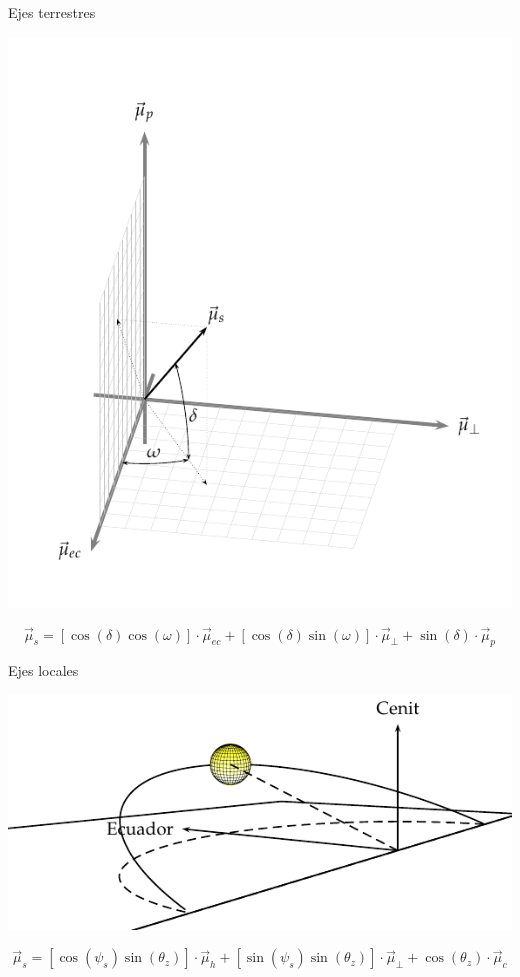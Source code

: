 \documentclass[xcolor={usenames,svgnames,dvipsnames}]{beamer}
\begin{document}
\begin{frame}[label={sec:org174ea23}]{Ejes terrestres}
\begin{center}
\includegraphics[height=0.7\textheight]{../figs/SistemaCoordenadasTerrestre.pdf}
\end{center}


\[\vec{\mu}_{s}=\left[\cos\left(\delta\right)\cos\left(\omega\right)\right]\cdot\vec{\mu}_{ec}+\left[\cos\left(\delta\right)\sin\left(\omega\right)\right]\cdot\vec{\mu}_{\bot}+\sin\left(\delta\right)\cdot\vec{\mu}_{p}\]
\end{frame}


\begin{frame}[label={sec:orgc8a26f2}]{Ejes locales}
\begin{center}
\includegraphics[width=.9\linewidth]{../figs/SoldesdeTierra2.pdf}
\end{center}

\[\vec{\mu}_{s}=\left[\cos\left(\psi_{s}\right)\sin\left(\theta_{z}\right)\right]\cdot\vec{\mu}_{h}+\left[\sin\left(\psi_{s}\right)\sin\left(\theta_{z}\right)\right]\cdot\vec{\mu}_{\bot}+\cos\left(\theta_{z}\right)\cdot\vec{\mu}_{c}\]
\end{frame}
\end{document}
